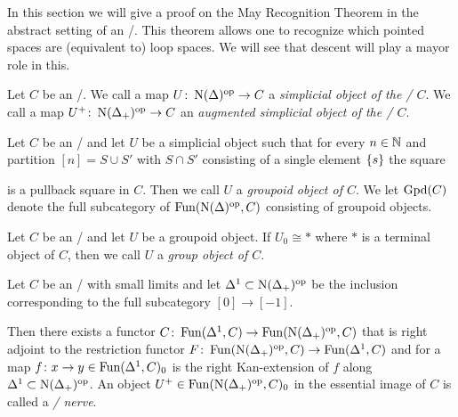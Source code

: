 In this section we will give a proof on the May Recognition Theorem in the abstract setting of an \inftytop/.
This theorem allows one to recognize which pointed spaces are (equivalent to) loop spaces.
We will see that descent will play a mayor role in this.
\begin{definition} %
    Let $C$ be an \inftycat/. 
    We call a map $U\colon\operatorname{N}(\Delta)^{\operatorname{op}}\to C$ a \emph{simplicial object of the \inftycat/ $C$}.
    We call a map $U^+\colon\operatorname{N}(\Delta_+)^{\operatorname{op}}\to C$ an \emph{augmented simplicial object of the \inftycat/ $C$}.
\end{definition}
\begin{definition}
    Let $C$ be an \inftycat/ and let $U$ be a simplicial object such that for every $n\in\mathbb{N}$ and partition $[n]=S\cup S'$ with $S\cap S'$ consisting of a single element $\left\lbrace s\right\rbrace$ the square
    \begin{center}
    \end{center}
    is a pullback square in $C$.
    Then we call $U$ a \emph{groupoid object of $C$}.
    We let $\operatorname{Gpd}(C)$ denote the full subcategory of $\operatorname{Fun}(\operatorname{N}(\Delta)^{\operatorname{op}},C)$ consisting of groupoid objects.
\end{definition}
\begin{definition}
    Let $C$ be an \inftycat/ and let $U$ be a groupoid object.
    If $U_0\cong *$ where $*$ is a terminal object of $C$, then we call $U$ a \emph{group object of $C$}.
\end{definition}
\begin{definition} %
    Let $C$ be an \inftycat/ with small limits and let $\Delta^1\subset\operatorname{N}(\Delta_+)^{\operatorname{op}}$ be the inclusion corresponding to the full subcategory $[0]\to[-1]$.
    
    Then there exists a functor $C\colon\operatorname{Fun}(\Delta^1,C)\to\operatorname{Fun}(\operatorname{N}(\Delta_+)^{\operatorname{op}},C)$ that is right adjoint to the restriction functor $F\colon\operatorname{Fun}(\operatorname{N}(\Delta_+)^{\operatorname{op}},C)\to\operatorname{Fun}(\Delta^1,C)$ and for a map $f\colon x\to y\in\operatorname{Fun}(\Delta^1,C)_0$ is the right Kan-extension of $f$ along $\Delta^1\subset\operatorname{N}(\Delta_+)^{\operatorname{op}}$.
    An object $U^+\in\operatorname{Fun}(\operatorname{N}(\Delta_+)^{\operatorname{op}},C)_0$ in the essential image of $C$ is called a \emph{\Cech/ nerve}.
\end{definition}

